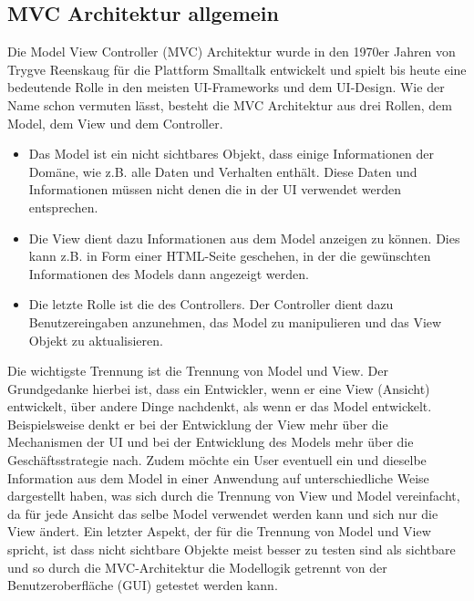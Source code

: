 \subsection{MVC Architektur allgemein}
\label{sec:mvc}
Die Model View Controller (MVC) Architektur wurde in den 1970er Jahren von Trygve Reenskaug für die Plattform Smalltalk entwickelt und spielt bis heute eine bedeutende Rolle in den meisten UI-Frameworks und dem UI-Design\autocite[S. 330]{PEAA2002}.
Wie der Name schon vermuten lässt, besteht die MVC Architektur aus drei Rollen, dem Model, dem View und dem Controller.
\begin{itemize}
\item Das Model ist ein nicht sichtbares Objekt, dass einige Informationen der Domäne, wie z.B. alle Daten und Verhalten enthält. Diese Daten und Informationen müssen nicht denen die in der UI verwendet werden entsprechen\autocite[S. 330]{PEAA2002}.

\item Die View dient dazu Informationen aus dem Model anzeigen zu können. Dies kann z.B. in Form einer HTML-Seite geschehen, in der die gewünschten Informationen des Models dann angezeigt werden\autocite[S. 330]{PEAA2002}.

\item Die letzte Rolle ist die des Controllers. Der Controller dient dazu Benutzereingaben anzunehmen, das Model zu manipulieren und das View Objekt zu aktualisieren\autocite[S. 330f]{PEAA2002}.
\end{itemize}
Die wichtigste Trennung ist die Trennung von Model und View. Der Grundgedanke hierbei ist, dass ein Entwickler, wenn er eine View (Ansicht) entwickelt, über andere Dinge nachdenkt, als wenn er das Model entwickelt. Beispielsweise denkt er bei der Entwicklung der View mehr über die Mechanismen der UI und bei der Entwicklung des Models mehr über die Geschäftsstrategie nach. Zudem möchte ein User eventuell ein und dieselbe Information aus dem Model in einer Anwendung auf unterschiedliche Weise dargestellt haben, was sich durch die Trennung von View und Model vereinfacht, da für jede Ansicht das selbe Model verwendet werden kann und sich nur die View ändert. Ein letzter Aspekt, der für die Trennung von Model und View spricht, ist dass nicht sichtbare Objekte meist besser zu testen sind als sichtbare und so durch die MVC-Architektur die Modellogik getrennt von der Benutzeroberfläche (GUI) getestet werden kann.
